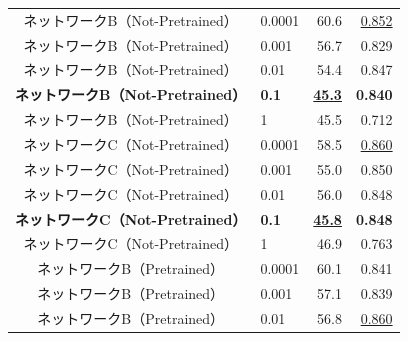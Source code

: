 \documentclass[12pt]{jarticle}
\numberwithin{equation}{section}    %
\numberwithin{figure}{section}      %
\numberwithin{table}{section}      %
\begin{document}
\begin{table}[bt]
\begin{center}
{\begin{tabular}{|c|l|rr|}
                \hline
                ネットワークB（Not-Pretrained）          & 0.0001                                   & 60.6                         & \underline{0.852}          \\
                ネットワークB（Not-Pretrained）          & 0.001                                    & 56.7                         & 0.829                      \\
                ネットワークB（Not-Pretrained）          & 0.01                                     & 54.4                         & 0.847                      \\
                \textbf{ネットワークB（Not-Pretrained）} & \textbf{0.1}                             & \underline{\textbf{45.3}}    & \textbf{0.840}             \\
                ネットワークB（Not-Pretrained）          & 1                                        & 45.5                         & 0.712                      \\
                \hline
                ネットワークC（Not-Pretrained）          & 0.0001                                   & 58.5                         & \underline{0.860}          \\
                ネットワークC（Not-Pretrained）          & 0.001                                    & 55.0                         & 0.850                      \\
                ネットワークC（Not-Pretrained）          & 0.01                                     & 56.0                         & 0.848                      \\
                \textbf{ネットワークC（Not-Pretrained）} & \textbf{0.1}                             & \underline{\textbf{45.8}}    & \textbf{0.848}             \\
                ネットワークC（Not-Pretrained）          & 1                                        & 46.9                         & 0.763                      \\
                \hline
                ネットワークB（Pretrained）              & 0.0001                                   & 60.1                         & 0.841                      \\
                ネットワークB（Pretrained）              & 0.001                                    & 57.1                         & 0.839                      \\
                ネットワークB（Pretrained）              & 0.01                                     & 56.8                         & \underline{0.860}          \\

\end{tabular}}
\end{center}
\end{table}
\end{document}
